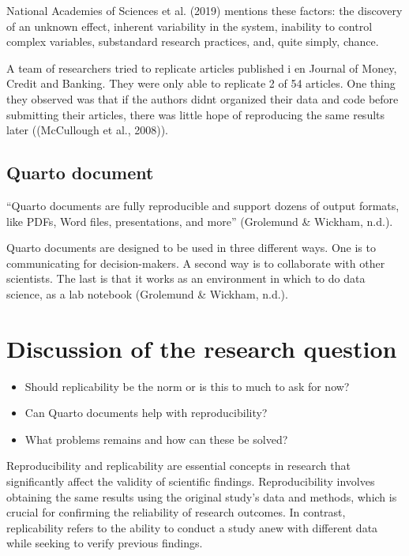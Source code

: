 \documentclass[
  a4paper,
]{article}
\providecommand{\tightlist}{%
  \setlength{\itemsep}{0pt}\setlength{\parskip}{0pt}}\usepackage{longtable,booktabs,array}
\begin{document}
National Academies of Sciences et al. (2019) mentions these factors: the
discovery of an unknown effect, inherent variability in the system,
inability to control complex variables, substandard research practices,
and, quite simply, chance.

A team of researchers tried to replicate articles published i en Journal
of Money, Credit and Banking. They were only able to replicate 2 of 54
articles. One thing they observed was that if the authors didnt
organized their data and code before submitting their articles, there
was little hope of reproducing the same results later ((McCullough et
al., 2008)).

\subsection{Quarto document}\label{quarto-document}

``Quarto documents are fully reproducible and support dozens of output
formats, like PDFs, Word files, presentations, and more'' (Grolemund \&
Wickham, n.d.).

Quarto documents are designed to be used in three different ways. One is
to communicating for decision-makers. A second way is to collaborate
with other scientists. The last is that it works as an environment in
which to do data science, as a lab notebook (Grolemund \& Wickham,
n.d.).

\section{Discussion of the research
question}\label{discussion-of-the-research-question}

\begin{itemize}
\tightlist
\item
  Should replicability be the norm or is this to much to ask for now?
\item
  Can Quarto documents help with reproducibility?
\item
  What problems remains and how can these be solved?
\end{itemize}

Reproducibility and replicability are essential concepts in research
that significantly affect the validity of scientific findings.
Reproducibility involves obtaining the same results using the original
study's data and methods, which is crucial for confirming the
reliability of research outcomes. In contrast, replicability refers to
the ability to conduct a study anew with different data while seeking to
verify previous findings.
\end{document}
